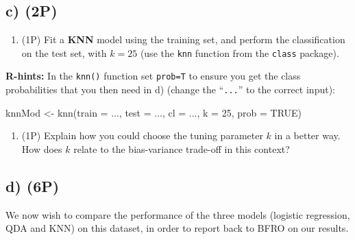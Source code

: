 \documentclass[
]{article}
\newenvironment{Shaded}{\begin{snugshade}}{\end{snugshade}}
\newcommand{\AttributeTok}[1]{\textcolor[rgb]{0.77,0.63,0.00}{#1}}
\newcommand{\ConstantTok}[1]{\textcolor[rgb]{0.00,0.00,0.00}{#1}}
\newcommand{\DecValTok}[1]{\textcolor[rgb]{0.00,0.00,0.81}{#1}}
\newcommand{\FunctionTok}[1]{\textcolor[rgb]{0.00,0.00,0.00}{#1}}
\newcommand{\NormalTok}[1]{#1}
\newcommand{\OtherTok}[1]{\textcolor[rgb]{0.56,0.35,0.01}{#1}}
\providecommand{\tightlist}{%
  \setlength{\itemsep}{0pt}\setlength{\parskip}{0pt}}
\begin{document}
\hypertarget{c-2p}{%
\subsection{c) (2P)}\label{c-2p}}

\begin{enumerate}
\def\labelenumi{(\roman{enumi})}
\tightlist
\item
  (1P) Fit a \textbf{KNN} model using the training set, and perform the
  classification on the test set, with \(k = 25\) (use the \texttt{knn}
  function from the \texttt{class} package).
\end{enumerate}

\textbf{R-hints:} In the \texttt{knn()} function set \texttt{prob=T} to
ensure you get the class probabilities that you then need in d) (change
the ``\texttt{...}'' to the correct input):

\begin{Shaded}
\begin{Highlighting}[]
\NormalTok{knnMod }\OtherTok{\textless{}{-}} \FunctionTok{knn}\NormalTok{(}\AttributeTok{train =}\NormalTok{ ..., }\AttributeTok{test =}\NormalTok{ ..., }\AttributeTok{cl =}\NormalTok{ ..., }\AttributeTok{k =} \DecValTok{25}\NormalTok{, }\AttributeTok{prob =} \ConstantTok{TRUE}\NormalTok{)}
\end{Highlighting}
\end{Shaded}

\begin{enumerate}
\def\labelenumi{(\roman{enumi})}
\setcounter{enumi}{1}
\tightlist
\item
  (1P) Explain how you could choose the tuning parameter \(k\) in a
  better way. How does \(k\) relate to the bias-variance trade-off in
  this context?
\end{enumerate}

\hypertarget{d-6p}{%
\subsection{d) (6P)}\label{d-6p}}

We now wish to compare the performance of the three models (logistic
regression, QDA and KNN) on this dataset, in order to report back to
BFRO on our results.
\end{document}
